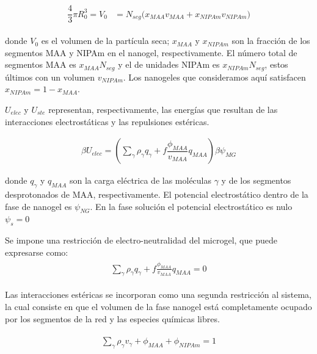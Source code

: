 	\begin{align}
		\begin{aligned} 
			\dfrac{4}{3}\pi R_0^3=V_0&=N_{seg}\Big( x_{MAA} v_{MAA} +x_{NIPAm} v_{NIPAm}\Big)
		\end{aligned}
	\end{align}
	
	
	\noindent donde $V_0$ es el volumen de la part\'icula seca; $x_{MAA}$ y $x_{NIPAm}$ son la fracci\'on de los segmentos MAA y NIPAm en el nanogel, respectivamente. %
	El n\'umero total de segmentos MAA es $x_{MAA}N_{seg}$ y el de unidades NIPAm es $x_{NIPAm}N_{seg}$, estos \'ultimos con un volumen $v_{NIPAm}$.
	Los nanogeles que consideramos aqu\'i satisfacen $x_{NIPAm}=1-x_{MAA}$.
	
	
	$U_{elec}$ y $U_{ste}$ representan, respectivamente, las energ\'ias que resultan de las interacciones electrost\'aticas y las repulsiones est\'ericas.
	
	\begin{align}
		\beta U_{elec} =\left(\sum_{\gamma } {\rho_\gamma q_\gamma + f\dfrac{\phi_{MAA}}{v_{MAA}}q_{MAA}}\right)\beta\psi_{MG}
	\end{align}
	
	\noindent donde $q_\gamma$ y $q_{MAA}$ son la carga el\'ectrica de las moléculas $\gamma$ y de los segmentos desprotonados de MAA, respectivamente.
	El potencial electrost\'atico dentro de la fase de nanogel es $\psi_{NG}$. En la fase soluci\'on el potencial electrost\'atico es nulo $\psi_s = 0$
	
	Se impone una restricci\'on de electro-neutralidad del microgel, que puede expresarse como:
	\begin{align}
		\begin{aligned}
			\sum_{\gamma  } \rho_\gamma q_\gamma + f\frac{\phi_{MAA}}{v_{MAA}}q_{MAA}=0
		\end{aligned}
		\label{eq:mc:charge-neutrality}
	\end{align}
	
	Las interacciones est\'ericas se incorporan como una segunda restricci\'on al sistema, la cual consiste en que el volumen de la fase nanogel est\'a completamente ocupado por los segmentos de la red y las especies qu\'imicas libres.
	
	\begin{align}
		\begin{aligned}
			\sum_{\gamma } \rho_\gamma v_\gamma  + \phi_{MAA} + \phi_{NIPAm} = 1
		\end{aligned}
		\label{eq:mc:packing}
	\end{align}
	
